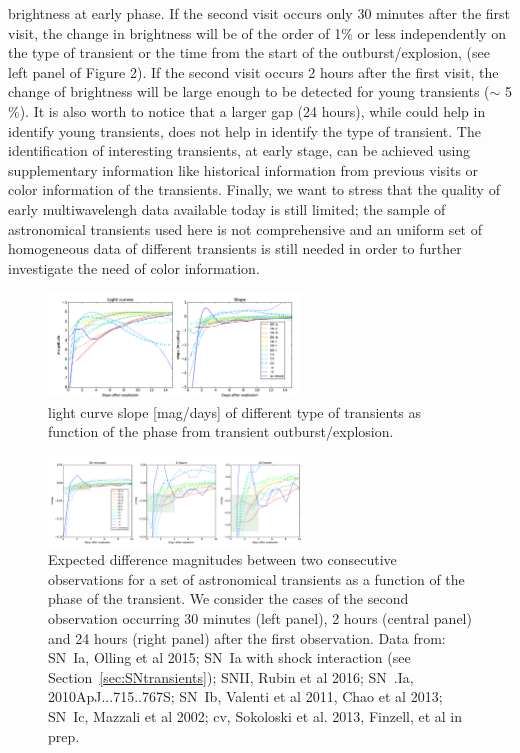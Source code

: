 brightness at early phase. If the second visit occurs only 30 minutes
after the first visit, the change in brightness will be of the order of
1$\%$ or less independently on the type of transient or the time from
the start of the outburst/explosion, (see left panel of Figure 2). If
the second visit occurs 2 hours after the first visit, the change of
brightness will be large enough to be detected for young transients
($\sim$ 5$\%$). It is also worth to notice that a larger gap (24 hours),
while could help in identify young transients, does not help in identify
the type of transient.  The identification of interesting transients, at
early stage, can be achieved using supplementary information like
historical information from previous visits or color information of the
transients. Finally, we want to stress that the quality of early
multiwavelengh data available today is still limited; the sample of
astronomical transients used here is not comprehensive and an uniform
set of homogeneous data of different transients is still needed in order
to further investigate the need of color information.

\begin{figure}[hbt]
\centerline{
\includegraphics[width=0.6\textwidth]{figs/transients/earlyslope1.pdf}
}
\caption{light curve slope [mag/days] of different type of transients as
function of the phase from transient outburst/explosion.}
\label{fig:earlyslope}
\end{figure}

\begin{figure}[hbt]
\centerline{
\includegraphics[width=0.6\textwidth]{figs/transients/earlyrise1.pdf}
}
\caption{Expected difference magnitudes between two consecutive
observations for a set of astronomical transients as a function of the
phase of the transient. We consider the cases of the second observation
occurring 30 minutes (left panel), 2 hours (central panel) and 24 hours
(right panel) after the first observation. Data from: SN~Ia,  Olling et
al 2015; SN~Ia with shock interaction (see Section~\ref{sec:SNtransients}); SNII, Rubin et al 2016; SN~.Ia, 2010ApJ...715..767S; SN~Ib,
Valenti et al 2011, Chao et al 2013; SN~Ic, Mazzali et al 2002; cv,
Sokoloski et al. 2013, Finzell, et al in prep.
}
\label{fig:earlyrise}
\end{figure}
%
